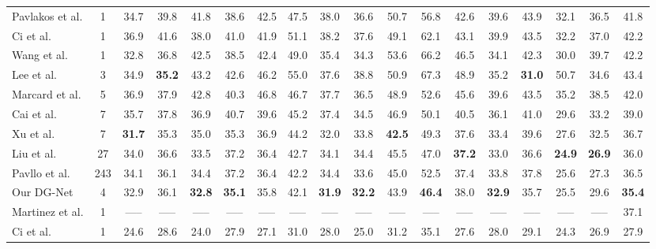 \documentclass[journal]{IEEEtran}
\begin{document}
\begin{table*}[t]
\begin{center}
{\begin{tabular}{l| c | c |c |c |c |c |c |c |c |c |c |c |c |c |c |c |c}
Pavlakos et al. \cite{ordinal}
& 1 &34.7       &39.8      &41.8   &38.6      &42.5           &47.5     &38.0     &36.6 &50.7 &56.8&42.6   &39.6   &43.9 &32.1 &36.5 &41.8\\
Ci et al.\cite{Ci_2019_ICCV}
& 1 &36.9       &41.6      &38.0   &41.0      &41.9           &51.1     &38.2     &37.6&49.1 &62.1&43.1   &39.9   &43.5 &32.2 &37.0 &42.2\\
Wang et al.\cite{Wang_2019_ICCV}
& 1 &32.8&36.8      &42.5   &38.5      &42.4           &49.0     &35.4     &34.3&53.6 &66.2&46.5   &34.1   &42.3 &30.0 &39.7 &42.2\\
Lee et al.\cite{Lee_2018_ECCV}
&  3  &34.9  &\textbf{35.2} &43.2   &42.6      &46.2           &55.0     &37.6     &38.8&50.9 &67.3&48.9   &35.2   &\textbf{31.0} &50.7 &34.6 &43.4\\
Marcard et al.\cite{eccv2018temporal}
&  5  &36.9       &37.9 &42.8   &40.3      &46.8           &46.7     &37.7     &36.5&48.9 &52.6&45.6   &39.6   &43.5 &35.2 &38.5 &42.0\\
Cai et al.\cite{Cai_2019_ICCV}
&  7  &35.7       &37.8      &36.9   &40.7      &39.6           &45.2     &37.4     &34.5&46.9 &50.1&40.5   &36.1   &41.0 &29.6 &33.2 &39.0\\
Xu et al.\cite{Xu_2020_CVPR}
&7 &\textbf{31.7} &35.3 &35.0 &35.3 &36.9 &44.2 &32.0 &33.8 &\textbf{42.5} &49.3 &37.6 &33.4 &39.6 &27.6 &32.5 &36.7 \\
Liu et al.\cite{liu2020gast} &27 &34.0 &36.6 &33.5 &37.2 &36.4 &42.7 &34.1 &34.4 &45.5 &47.0 &\textbf{37.2} &33.0 &36.6 &\textbf{24.9} &\textbf{26.9} &36.0\\
Pavllo et al.\cite{pavllo:videopose3d:2019}
& 243 &34.1       &36.1 &34.4   &37.2 &36.4 &42.2&34.4&33.6&45.0 &52.5&37.4&33.8&37.8&25.6 &27.3 &36.5\\
\hline
Our DG-Net			
& 4   &32.9      &36.1      &\textbf{32.8}&\textbf{35.1}&35.8&42.1 &\textbf{31.9}&\textbf{32.2}&43.9 &\textbf{46.4}&38.0&\textbf{32.9}&35.7 &25.5 &29.6&\textbf{35.4}\\
\hline\hline
Martinez et al.\cite{simple} 
& 1 &-----  &----- &-----  &-----  &-----  &-----  &----- &-----  &----- &-----  &-----  &----- &----- &----- &----- & 37.1\\
Ci et al.\cite{Ci_2019_ICCV}
& 1 &24.6    &28.6   &24.0    &27.9    &27.1    &31.0    &28.0   &25.0    &31.2   &35.1    &27.6    &28.0   &29.1   &24.3   &26.9   &27.9\\



\end{tabular}}
\end{center}
\end{table*}
\end{document}
